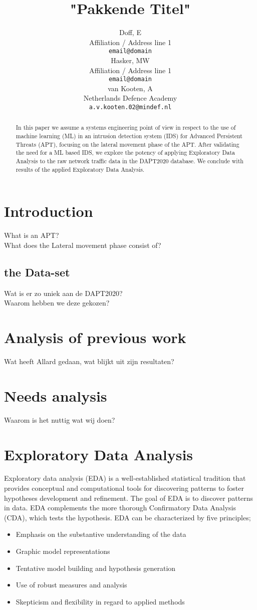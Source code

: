 \documentclass[11pt]{article}
\title{"Pakkende Titel"}
\author{Doff, E \\
  Affiliation / Address line 1 \\
  {\tt email@domain} \\\And
  Hasker, MW \\
  Affiliation / Address line 1 \\
  {\tt email@domain} \\\And
  van Kooten, A \\
  Netherlands Defence Academy \\
  {\tt a.v.kooten.02@mindef.nl}  }
\date{}
\begin{document}
\maketitle
\begin{abstract}
In this paper we assume a systems engineering point of view in respect to the use of machine learning (ML) in an intrusion detection system (IDS) for Advanced Persistent Threats (APT), focusing on the lateral movement phase of the APT. After validating the need for a ML based IDS, we explore the potency of applying Exploratory Data Analysis to the raw network traffic data in the DAPT2020 database\cite{Myneni2020}. We conclude with results of the applied Exploratory Data Analysis.
\end{abstract}


\section{Introduction}
What is an APT?\\
What does the Lateral movement phase consist of?

\subsection{the Data-set}
Wat is er zo uniek aan de DAPT2020?\\
Waarom hebben we deze gekozen?

\section{Analysis of previous work}
Wat heeft Allard gedaan, wat blijkt uit zijn resultaten?

\section{Needs analysis}
Waarom is het nuttig wat wij doen?

\section{Exploratory Data Analysis}
Exploratory data analysis (EDA) is a well-established statistical tradition that provides conceptual and computational tools for discovering patterns to foster hypotheses development and refinement\cite{Behrens1997}. The goal of EDA is to discover patterns in data. EDA complements the more thorough Confirmatory Data Analysis (CDA), which tests the hypothesis. EDA can be characterized by five principles;
\begin{itemize}
    \item Emphasis on the substantive understanding of the data
    \item Graphic model representations
    \item Tentative model building and hypothesis generation
    \item Use of robust measures and analysis
    \item Skepticism and flexibility in regard to applied methods
\end{itemize}
\end{document}
